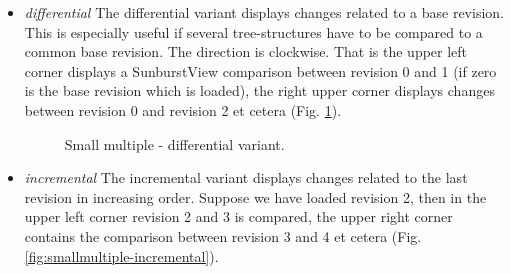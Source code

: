 \begin{itemize}
\item \emph{differential} The differential variant displays changes related to a base revision. This is especially useful if several tree-structures have to be compared to a common base revision. The direction is clockwise. That is the upper left corner displays a SunburstView comparison between revision 0 and 1 (if zero is the base revision which is loaded), the right upper corner displays changes between revision 0 and revision 2 et cetera (Fig. \ref{fig:smallmultiple-differential}).

\begin{figure}[tb]
\caption{\label{fig:smallmultiple-differential} Small multiple - differential variant.}
\end{figure}

\item \emph{incremental} The incremental variant displays changes related to the last revision in increasing order. Suppose we have loaded revision 2, then in the upper left corner revision 2 and 3 is compared, the upper right corner contains the comparison between revision 3 and 4 et cetera (Fig. \ref{fig:smallmultiple-incremental}).


\end{itemize}
